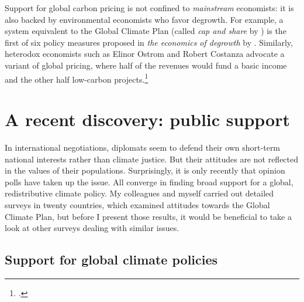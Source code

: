 \documentclass[a5paper,english,openany]{memoir}
\begin{document}
Support for global carbon pricing is not confined to \textit{mainstream} economists: it is also backed by environmental economists who favor  %
degrowth. For example, a system equivalent to the Global Climate Plan (called \textit{cap and share} by \citealp{douthwaite_degrowth_2012}) is the first of six policy measures proposed in \textit{the economics of degrowth} by \cite{kallis_economics_2012}. Similarly, heterodox economists such as Elinor Ostrom and Robert Costanza advocate a variant of global pricing, where half of the revenues would fund a basic income and the other half low-carbon projects.\footnote{\citet{barnes_creating_2008}.}

\section*{A recent discovery: public support} \label{sec:support}

In international negotiations, diplomats seem to defend their own short-term %
national interests rather than climate justice. 
But their attitudes are not reflected in the values of their populations. %
Surprisingly, it is only recently that opinion polls have taken up the issue. All converge in finding broad support for a global, redistributive climate policy. My colleagues and myself carried out detailed surveys in twenty countries, which examined attitudes towards the Global Climate Plan, but before I present those results, 
it would be beneficial to %
take a look at other surveys dealing with similar issues. 

\subsection*{Support for global climate policies}
\end{document}
